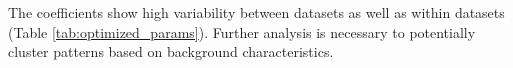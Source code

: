 \documentclass[iucr,review]{iucrjournals}
\begin{document}

The coefficients show high variability between datasets as well as within datasets (Table \ref{tab:optimized_params}).
Further analysis is necessary to potentially cluster patterns based on background characteristics.
\end{document}
